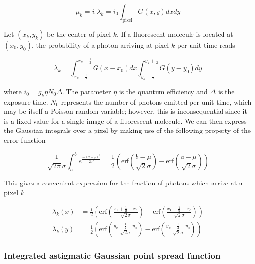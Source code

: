 \documentclass{ucetd}
\begin{document}
\begin{equation}
\mu_{k} = i_{0}\lambda_{k} = i_{0}\int_{\mathrm{pixel}} G(x,y)dxdy
\end{equation}

Let $(x_{k},y_{k})$ be the center of pixel $k$. If a fluorescent molecule is located at $(x_{0},y_{0})$, the probability of a photon arriving at pixel $k$ per unit time reads

\begin{equation*}
\lambda_{k} = \int_{x_{k}-\frac{1}{2}}^{x_{k}+\frac{1}{2}}G(x-x_{0})dx \int_{y_{k}-\frac{1}{2}}^{y_{k}+\frac{1}{2}} G(y-y_{0})dy
\end{equation*}

\vspace{0.2in}
where $i_{0} = g_{k}\eta N_{0}\Delta$. The parameter $\eta$ is the quantum efficiency and $\Delta$ is the exposure time. $N_{0}$ represents the number of photons emitted per unit time, which may be itself a Poisson random variable; however, this is inconsequential since it is a fixed value for a single image of a fluorescent molecule. We can then express the Gaussian integrals over a pixel by making use of the following property of the error function

\begin{equation*}
\frac{1}{\sqrt{2\pi}\sigma}\int_{a}^{b} e^{\frac{-(x-\mu)^{2}}{2\sigma^{2}}} = \frac{1}{2}\left(\mathrm{erf}\left(\frac{b-\mu}{\sqrt{2}\sigma}\right) -\mathrm{erf}\left(\frac{a-\mu}{\sqrt{2}\sigma}\right)\right)
\end{equation*}

This gives a convenient expression for the fraction of photons which arrive at a pixel $k$

\begin{align*}
\lambda_{k}(x) &= \frac{1}{2}\left(\mathrm{erf}\left(\frac{x_{k}+\frac{1}{2}-x_{0}}{\sqrt{2}\sigma}\right) -\mathrm{erf}\left(\frac{x_{k}-\frac{1}{2}-x_{0}}{\sqrt{2}\sigma}\right)\right)\\
\lambda_{k}(y) &= \frac{1}{2}\left(\mathrm{erf}\left(\frac{y_{k}+\frac{1}{2}-y_{0}}{\sqrt{2}\sigma}\right) -\mathrm{erf}\left(\frac{y_{k}-\frac{1}{2}-y_{0}}{\sqrt{2}\sigma}\right)\right)
\end{align*}

\subsubsection{Integrated astigmatic Gaussian point spread function}
\end{document}
